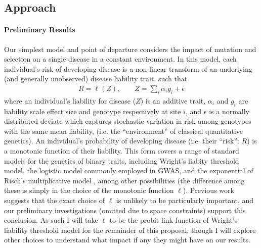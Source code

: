 \documentclass[11pt]{article}
\begin{document}

\subsection*{Approach}
\paragraph{Preliminary Results}
Our simplest model and point of departure considers the impact of mutation and selection on a single disease in a constant environment. In this model, each individual's risk of developing disease is a non-linear transform of an underlying (and generally unobserved) disease liability trait, such that
\begin{align}
  R=\ell(Z),    \qquad    Z = \sum_{i}\alpha_ig_i + \epsilon
\end{align}
where an individual's liability for disease ($Z$) is an additive trait, $\alpha_i$ and $g_i$ are liability scale effect size and genotype respectively at site $i$, and $\epsilon$ is a normally distributed deviate which captures stochastic variation in risk among genotypes with the same mean liability, (i.e. the ``environment'' of classical quantitative genetics). An individual's probability of developing disease (i.e. their ``risk'': $R$) is a monotonic function of their liability. This form covers a range of standard models for the genetics of binary traits, including Wright's liabity threshold model\cite{Wright:1934wd,Lush:1948vc,FalconerAndMcKay,Falconer:1965bn}, the logistic model commonly employed in GWAS\cite{Risch:1996ub}, and the exponential of Risch's multiplicative model \cite{Risch:1990ty}, among other possibilities (the difference among these is simply in the choice of the monotonic function $\ell$). Previous work \cite{Slatkin:2008hw, Wray:2010ir} suggests that the exact choice of $\ell$ is unlikely to be particularly important, and our preliminary investigations (omitted due to space constraints) support this conclusion. As such I will take $\ell$ to be the probit link function of Wright's liability threshold model for the remainder of this proposal, though I will explore other choices to understand what impact if any they might have on our results.
\end{document}
